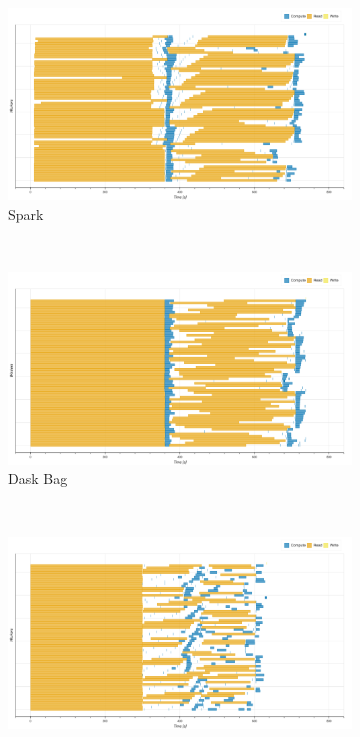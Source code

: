 \documentclass[conference]{IEEEtran}
\begin{document}
\begin{figure}[!htb]
    \centering
    \begin{subfigure}[b]{\columnwidth}
        \includegraphics[clip,width=\columnwidth]{images/spark_histo_np_gantt.png}
        \caption{Spark}\label{fig:histo_np_spark_gantt}
    \end{subfigure}
    \\
    \begin{subfigure}[b]{\columnwidth}
        \includegraphics[clip,width=\columnwidth]{images/bag_histo_np_gantt.png}%
        \caption{Dask Bag}\label{fig:histo_np_dask_bag_gantt}
    \end{subfigure}
    \\
    \begin{subfigure}[b]{\columnwidth}
        \includegraphics[clip,width=\columnwidth]{images/delayed_histo_np_gantt.png}%

\end{subfigure}
\end{figure}
\end{document}

